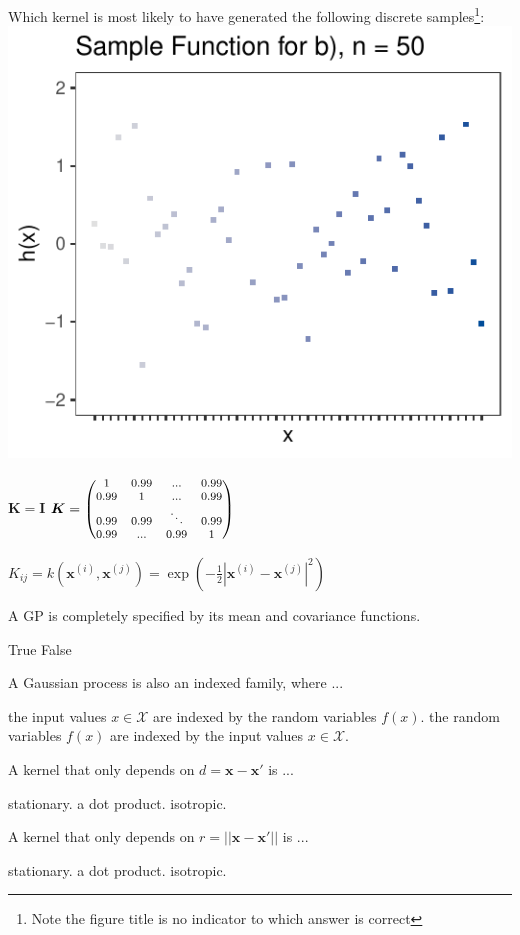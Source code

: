 \documentclass{exam}
\newcommand{\xI}[1]{\mathbf{x}^{(#1)}}
\newcommand{\x}[0]{\mathbf{x}}
\begin{document}
\begin{questions}
		\question Which kernel is most likely to have generated the following discrete samples\footnote{Note the figure title is no indicator to which answer is correct}:\\
		\includegraphics[width=.22\textwidth]{w05_gps/figure_man/discrete/example_extreme_50-2.pdf}
		\begin{choices}
			\choice $\bm{K} = \boldsymbol{I}$ %
			\choice $\bm{K} = \begin{footnotesize}\begin{pmatrix} 1 & 0.99 & ... & 0.99 \\
			0.99 & 1 & ... & 0.99 \\
			0.99 & 0.99 & \ddots & 0.99 \\
			0.99 & ... & 0.99 & 1 \end{pmatrix}\end{footnotesize}$
			\choice \begin{footnotesize}$K_{ij} = k(\xI{i}, \xI{j}) = \exp\left(-\frac{1}{2}\left|\xI{i} - \xI{j}\right|^2\right)$\end{footnotesize}
		\end{choices}
		
		\question A GP is completely specified by its mean and covariance functions.
		\begin{choices}
			\choice True %
			\choice False
		\end{choices}
		
		\question A Gaussian process is also an indexed family, where ...
		\begin{choices}
			\choice the input values $x\in\mathcal{X}$ are indexed by the random variables $f(x)$. 
			\choice the random variables $f(x)$ are indexed by the input values $x\in\mathcal{X}$. %
		\end{choices}
		
		\question A kernel that only depends on $d = \x - \x'$ is ...
		\begin{choices}
			\choice stationary. %
			\choice a dot product.
			\choice isotropic.
		\end{choices}
		
		\question A kernel that only depends on $r = ||\x - \x'||$ is ...
		\begin{choices}
			\choice stationary.  %
			\choice a dot product.
			\choice isotropic. %
		\end{choices}
		

\end{questions}
\end{document}

